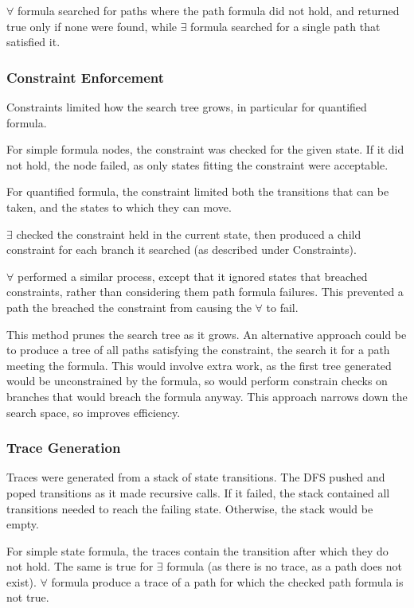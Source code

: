 \documentclass[a4paper,11pt]{article}
\begin{document}
	$\forall$ formula searched for paths where the path formula did not hold, and returned true only if none were found, while $\exists$ formula searched for a single path that satisfied it.
	
	\subsubsection{Constraint Enforcement}
	Constraints limited how the search tree grows, in particular for quantified formula. 
	
	For simple formula nodes, the constraint was checked for the given state. If it did not hold, the node failed, as only states fitting the constraint were acceptable.
	
	For quantified formula, the constraint limited both the transitions that can be taken, and the states to which they can move. 
	
	$\exists$ checked the constraint held in the current state, then produced a child constraint for each branch it searched (as described under Constraints).
	
	$\forall$ performed a similar process, except that it ignored states that breached constraints, rather than considering them path formula failures. This prevented a path the breached the constraint from causing the $\forall$ to fail.
	
	This method prunes the search tree as it grows. An alternative approach could be to produce a tree of all paths satisfying the constraint, the search it for a path meeting the formula. This would involve extra work, as the first tree generated would be unconstrained by the formula, so would perform constrain checks on branches that would breach the formula anyway. This approach narrows down the search space, so improves efficiency.
	
	\subsubsection{Trace Generation}
	Traces were generated from a stack of state transitions. The DFS pushed and poped transitions as it made recursive calls. If it failed, the stack contained all transitions needed to reach the failing state. Otherwise, the stack would be empty.
	
	For simple state formula, the traces contain the transition after which they do not hold. The same is true for $\exists$ formula (as there is no trace, as a path does not exist). $\forall$ formula produce a trace of a path for which the checked path formula is not true. 
	
\end{document}
